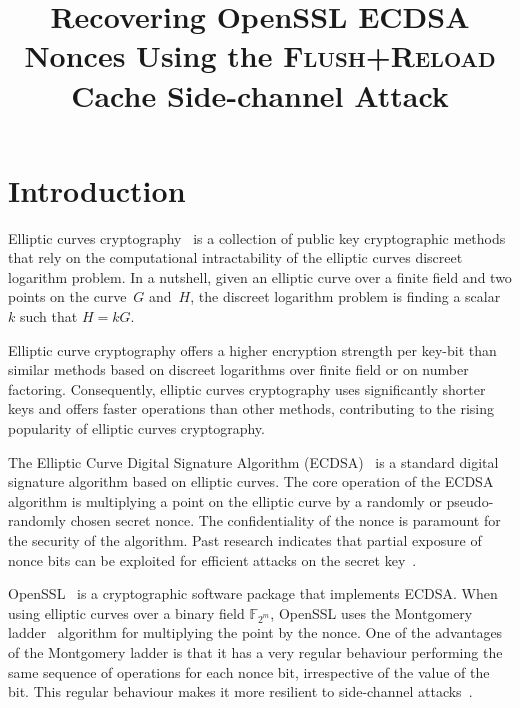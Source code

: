 \documentclass{llncs}
\begin{document}
\title{Recovering OpenSSL ECDSA Nonces Using the \textsc{Flush+Reload} Cache Side-channel Attack}

\maketitle

\begin{abstract}
\end{abstract}

\section{Introduction}
Elliptic curves cryptography~\cite{miller85use,koblitz87elliptic} is a collection of public key cryptographic methods that rely on the computational
intractability of the elliptic curves discreet logarithm problem.
In a nutshell, given an elliptic curve over a finite field and two points on the curve~$G$ and~$H$,
the discreet logarithm problem is finding a scalar $k$ such that $H=kG$.

Elliptic curve cryptography offers a higher encryption strength per key-bit than similar methods based on 
discreet logarithms over finite field or on number factoring.
Consequently, elliptic curves cryptography uses significantly shorter keys and offers faster operations
than other methods, contributing to the rising popularity of elliptic curves cryptography.

The Elliptic Curve Digital Signature Algorithm (ECDSA)~\cite{johnson01elliptic,fips186,ansi962} is a standard
digital signature algorithm based on elliptic curves.
The core operation of the ECDSA algorithm is multiplying a point on the elliptic curve by a randomly
or pseudo-randomly chosen secret nonce.
The confidentiality of the nonce is paramount for the security of the algorithm.
Past research indicates that partial exposure of nonce bits can be exploited for efficient attacks on the secret key~\cite{nguyen03insecurity,brumley11remote}.

OpenSSL~\cite{openssl} is a cryptographic software package that implements ECDSA.
When using elliptic curves over a binary field $\mathbb{F}_{2^m}$, OpenSSL uses the 
Montgomery ladder~\cite{montgomery87speeding,joye03montgomery} algorithm for multiplying the point by the nonce.
One of the advantages of the Montgomery ladder is that it has a very regular behaviour performing
the same sequence of operations for each nonce bit, irrespective of the value of the bit.
This regular behaviour makes it more resilient to side-channel attacks~\cite{joye03montgomery,okeya00elliptic}.
\end{document}
